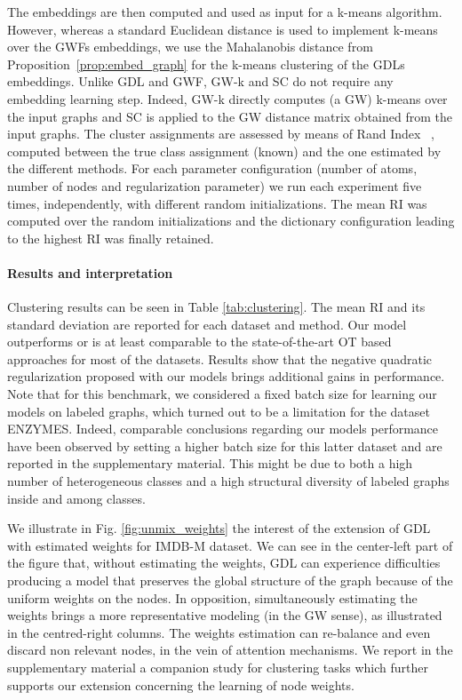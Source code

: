 \documentclass{article}
\begin{document}
	The embeddings  are then computed and used as input for a
	k-means algorithm. However, whereas a standard Euclidean distance is used to
	implement k-means over the GWFs embeddings, we use the Mahalanobis
	distance from Proposition~\ref{prop:embed_graph} for the k-means clustering of the GDLs embeddings. Unlike
	GDL and GWF, GW-k and SC do not require any embedding learning step. Indeed,
	GW-k directly computes (a GW) k-means over the input graphs and SC is applied to
	the  GW distance matrix obtained from the input graphs. The cluster assignments
	are assessed by means of Rand Index ~\citep[RI,][]{rand1971objective}, computed
	between the true class assignment (known) and the one estimated by the different
	methods. For each parameter configuration (number of atoms, number of nodes and
	regularization parameter)
	we run each experiment five times, independently, with different random initializations. The mean RI was computed over the random
	initializations and the dictionary configuration leading to the highest RI was
	finally retained.
	
	\paragraph{Results and interpretation} Clustering results can be seen in Table
	\ref{tab:clustering}. The mean RI and its standard deviation are reported for each dataset and method.
	Our model outperforms or is at least comparable to the state-of-the-art OT based approaches for most of the datasets. Results show that the negative quadratic regularization proposed with our models brings additional gains in performance. Note that for this benchmark, we considered a fixed batch size for learning our models on labeled graphs, which turned out to be a limitation for the dataset ENZYMES. Indeed, comparable conclusions regarding our models performance have been observed by setting a higher batch size for this latter dataset and are reported in the supplementary material.
	This might be due to both a high number of heterogeneous classes and a high structural diversity of labeled graphs inside and among classes.
	
	We illustrate in Fig. \ref{fig:unmix_weights} the interest of the extension of
	GDL with estimated weights for IMDB-M dataset. We can see in the center-left
	part of the figure that, without estimating the weights, GDL can experience
	difficulties producing a model that preserves the global structure of the graph
	because of the uniform weights on the nodes. In opposition, simultaneously
	estimating the weights brings a more representative modeling (in the GW sense),
	as illustrated in the centred-right columns. The weights estimation can
	re-balance and even discard non relevant nodes, in the vein of attention mechanisms. We report in the supplementary material a companion study for clustering tasks which further supports our extension concerning the learning of node weights.
	
\end{document}
